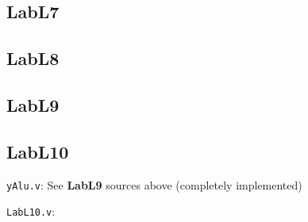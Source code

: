 \documentclass{article}
\begin{document}
\subsection{LabL7}


\subsection{LabL8}



\subsection{LabL9}



\subsection{LabL10}
\verb$yAlu.v$: See \textbf{LabL9} sources above (completely implemented)

\verb$LabL10.v$:


\end{document}

